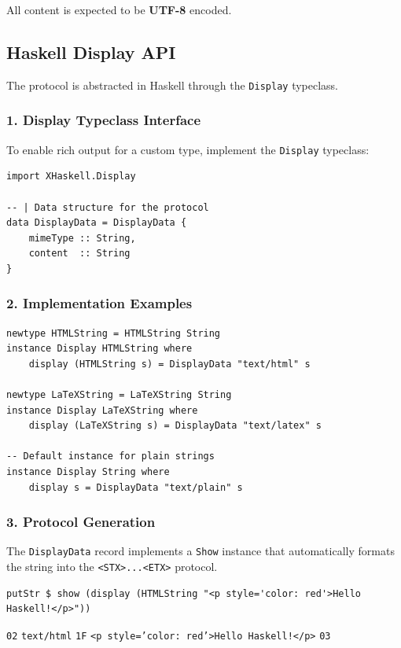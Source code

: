 \documentclass[11pt]{article}
\begin{document}
All content is expected to be \textbf{UTF-8} encoded.
\subsection{Haskell Display API}


The protocol is abstracted in Haskell through the \texttt{Display} typeclass.
\subsubsection{1. Display Typeclass Interface}


To enable rich output for a custom type, implement the \texttt{Display} typeclass:
\begin{verbatim}
import XHaskell.Display

-- | Data structure for the protocol
data DisplayData = DisplayData {
    mimeType :: String,
    content  :: String
}
\end{verbatim}


\subsubsection{2. Implementation Examples}


\begin{verbatim}
newtype HTMLString = HTMLString String
instance Display HTMLString where
    display (HTMLString s) = DisplayData "text/html" s

newtype LaTeXString = LaTeXString String
instance Display LaTeXString where
    display (LaTeXString s) = DisplayData "text/latex" s

-- Default instance for plain strings
instance Display String where
    display s = DisplayData "text/plain" s
\end{verbatim}


\subsubsection{3. Protocol Generation}


The \texttt{DisplayData} record implements a \texttt{Show} instance that automatically formats the string into the \texttt{<STX>...<ETX>} protocol.
\begin{verbatim}
putStr $ show (display (HTMLString "<p style='color: red'>Hello Haskell!</p>"))
\end{verbatim}


\texttt{02} \texttt{text/html} \texttt{1F} \texttt{<p style='color: red'>Hello Haskell!</p>} \texttt{03}
\end{document}
